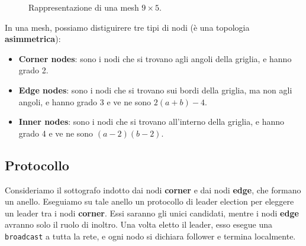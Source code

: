 \begin{figure}[htbp]
    \centering
    \caption{Rappresentazione di una mesh $9 \times 5$.}
    \label{fig:mesh_9x5}
\end{figure}

In una mesh, possiamo distiguirere tre tipi di nodi (è una topologia \textbf{asimmetrica}):
\begin{itemize}
    \item \textbf{Corner nodes}: sono i nodi che si trovano agli angoli della griglia, e hanno grado 2.
    \item \textbf{Edge nodes}: sono i nodi che si trovano sui bordi della griglia, ma non agli angoli, e hanno grado 3 e ve ne sono $2(a+b)-4$.
    \item \textbf{Inner nodes}: sono i nodi che si trovano all'interno della griglia, e hanno grado 4 e ve ne sono $(a-2)(b-2)$.
\end{itemize}

\subsection{Protocollo}

Consideriamo il sottografo indotto dai nodi \textbf{corner} e dai nodi \textbf{edge}, che formano un anello. Eseguiamo su tale anello un protocollo di leader election per eleggere un leader tra i nodi \textbf{corner}. Essi saranno gli unici candidati, mentre i nodi \textbf{edge} avranno solo il ruolo di inoltro. Una volta eletto il leader, esso esegue una \texttt{broadcast} a tutta la rete, e ogni nodo si dichiara follower e termina localmente.


